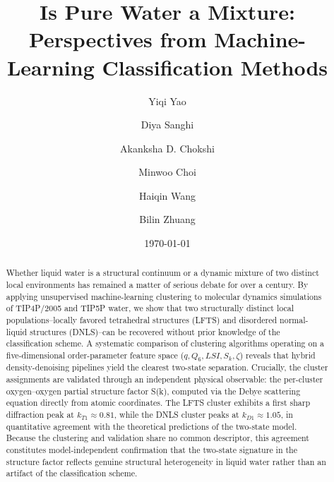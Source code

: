 \documentclass[aps, amsmath,amssymb, reprint, onecolumn,notitlepage,superscriptaddress]{revtex4-2}
\begin{document}

\title{Is Pure Water a Mixture: Perspectives from Machine-Learning Classification Methods}
\author{Yiqi Yao}
\author{Diya Sanghi}
\author{Akanksha D. Chokshi}
\author{Minwoo Choi}
\author{Haiqin Wang}
\author{Bilin Zhuang}
\date{\today}

\begin{abstract}
Whether liquid water is a structural continuum or a dynamic mixture of two distinct local environments has remained a matter of serious debate for over a century. By applying unsupervised machine-learning clustering to molecular dynamics simulations of TIP4P/2005 and TIP5P water, we show that two structurally distinct local populations--locally favored tetrahedral structures (LFTS) and disordered normal-liquid structures (DNLS)--can be recovered without prior knowledge of the classification scheme. A systematic comparison of clustering algorithms operating on a five-dimensional order-parameter feature space ($q,Q_6,LSI,S_k,\zeta$) reveals that hybrid density-denoising pipelines yield the clearest two-state separation. Crucially, the cluster assignments are validated through an independent physical observable: the per-cluster oxygen–oxygen partial structure factor S(k), computed via the Debye scattering equation directly from atomic coordinates. The LFTS cluster exhibits a first sharp diffraction peak at $k_{T1}\approx0.81$, while the DNLS cluster peaks at $k_{D1} \approx 1.05$, in quantitative agreement with the theoretical predictions of the two-state model. Because the clustering and validation share no common descriptor, this agreement constitutes model-independent confirmation that the two-state signature in the structure factor reflects genuine structural heterogeneity in liquid water rather than an artifact of the classification scheme.
\end{abstract}
\end{document}
